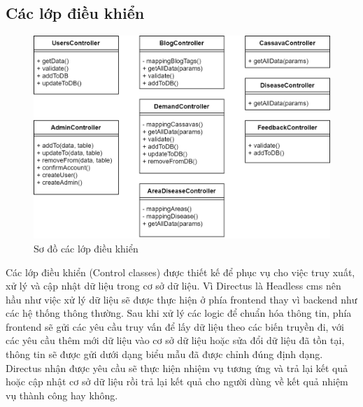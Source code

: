 \documentclass[./../main.tex]{subfiles}
\begin{document}
\subsection{Các lớp điều khiển}
\begin{figure}[H]
	\centering
	\includegraphics[width=\linewidth]{./img/controller.png}
	\caption{Sơ đồ các lớp điều khiển}
\end{figure}
Các lớp điều khiển (Control classes) được thiết kế để phục vụ cho việc truy xuất, xử lý và cập nhật dữ liệu trong cơ sở dữ liệu. Vì Directus là Headless \acrshort{cms} nên hầu như việc xử lý dữ liệu sẽ được thực hiện ở phía frontend thay vì backend như các hệ thống thông thường. Sau khi xử lý các logic để chuẩn hóa thông tin, phía frontend sẽ gửi các yêu cầu truy vấn để lấy dữ liệu theo các biến truyền đi, với các yêu cầu thêm mới dữ liệu vào cơ sở dữ liệu hoặc sửa đổi dữ liệu đã tồn tại, thông tin sẽ được gửi dưới dạng biểu mẫu đã được chỉnh đúng định dạng. Directus nhận được yêu cầu sẽ thực hiện nhiệm vụ tương ứng và trả lại kết quả hoặc cập nhật cơ sở dữ liệu rồi trả lại kết quả cho người dùng về kết quả nhiệm vụ thành công hay không. 
\end{document}
